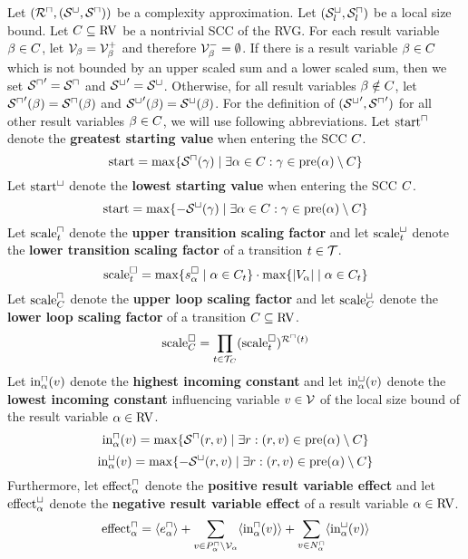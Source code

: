 \begin{theorem}
  Let $({\mathcal{R}^\sqcap}, {({\mathcal{S}^\sqcup}, {\mathcal{S}^\sqcap})})$ be a complexity approximation.
  Let ${({\mathcal{S}^\sqcup_l}, {\mathcal{S}^\sqcap_l})}$ be a local size bound.
  Let $C \subseteq \text{RV}$ be a nontrivial SCC of the RVG.
  For each result variable $\beta \in C$, let $\mathcal{V}_\beta = \mathcal{V}^+_\beta$ and therefore $\mathcal{V}^-_\beta = \emptyset$.
  If there is a result variable $\beta \in C$ which is not bounded by an upper scaled sum and a lower scaled sum, then we set ${\mathcal{S}^\sqcap}' = {\mathcal{S}^\sqcap}$ and ${\mathcal{S}^\sqcup}' = {\mathcal{S}^\sqcup}$.
  Otherwise, for all result variables $\beta \notin C$, let ${\mathcal{S}^\sqcap}'(\beta) = {\mathcal{S}^\sqcap}(\beta)$ and ${\mathcal{S}^\sqcup}'(\beta) = {\mathcal{S}^\sqcup}(\beta)$.
  For the definition of $({\mathcal{S}^\sqcup}', {\mathcal{S}^\sqcap}')$ for all other result variables $\beta \in C$, we will use following abbreviations.
  Let $\text{start}^\sqcap$ denote the \textbf{greatest starting value} when entering the SCC $C$.
  \[ \text{start} = \max \lbrace {\mathcal{S}^\sqcap}(\gamma) \mid \exists \alpha \in C: \gamma \in \text{pre}(\alpha) \setminus C \rbrace \]
  Let $\text{start}^\sqcup$ denote the \textbf{lowest starting value} when entering the SCC $C$.
  \[ \text{start} = \max \lbrace -{\mathcal{S}^\sqcup}(\gamma) \mid \exists \alpha \in C: \gamma \in \text{pre}(\alpha) \setminus C \rbrace \]
  Let $\text{scale}^\sqcap_t$ denote the \textbf{upper transition scaling factor} and let $\text{scale}^\sqcup_t$ denote the \textbf{lower transition scaling factor} of a transition $t \in \mathcal{T}$.
  \[ \text{scale}^\square_t = \max \lbrace s^\square_\alpha \mid \alpha \in C_t \rbrace \cdot \max \lbrace \left|V_\alpha\right| \mid \alpha \in C_t \rbrace \]
  Let $\text{scale}^\sqcap_C$ denote the \textbf{upper loop scaling factor} and let $\text{scale}^\sqcup_C$ denote the \textbf{lower loop scaling factor} of a transition $C \subseteq \text{RV}$.
  \[ \text{scale}^\square_C = \prod_{t \in \mathcal{T}_C} (\text{scale}^\square_t)^{{\mathcal{R}^\sqcap}(t)} \]
  Let $\text{in}^\sqcap_\alpha(v)$ denote the \textbf{highest incoming constant} and let $\text{in}^\sqcup_\alpha(v)$ denote the \textbf{lowest incoming constant} influencing variable $v \in \mathcal{V}$ of the local size bound of the result variable $\alpha \in \text{RV}$.
  \[ \text{in}^\sqcap_\alpha(v) = \max \lbrace {\mathcal{S}^\sqcap}(r, v) \mid \exists r: (r, v) \in \text{pre}(\alpha) \setminus C \rbrace \]
  \[ \text{in}^\sqcup_\alpha(v) = \max \lbrace -{\mathcal{S}^\sqcup}(r, v) \mid \exists r: (r, v) \in \text{pre}(\alpha) \setminus C \rbrace \]
  Furthermore, let $\text{effect}^\sqcap_\alpha$ denote the \textbf{positive result variable effect} and let $\text{effect}^\sqcup_\alpha$ denote the \textbf{negative result variable effect} of a result variable $\alpha \in \text{RV}$.
  \[ \text{effect}^\sqcap_\alpha = \langle e^{\sqcap}_\alpha\rangle + \sum_{v \in P_\alpha^\sqcap \setminus \mathcal{V}_\alpha} \langle\text{in}^\sqcap_\alpha(v)\rangle + \sum_{v \in N_\alpha^\sqcap} \langle\text{in}^\sqcup_\alpha(v)\rangle \]

\end{theorem}

